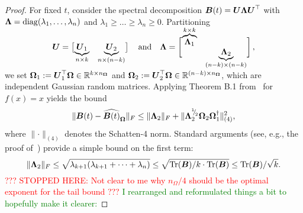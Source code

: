 \begin{proof}
For fixed $t$, consider the spectral decomposition $\boldsymbol{B}(t) = \boldsymbol{U} \boldsymbol{\Lambda} \boldsymbol{U}^{\top}$ with  
$\boldsymbol{\Lambda} = \operatorname{diag}(\lambda_1, \dots, \lambda_n)$ and $\lambda_1 \ge \dots \ge \lambda_n \ge 0$. Partitioning
    \begin{equation*}
        \rule[\dimexpr-2ex-\ht\strutbox]{0pt}{\dimexpr2ex+4ex+\baselineskip}
        \mtx{U} = \begin{bmatrix}
            \smash{\underbrace{\mtx{U}_1}_{n \times k}} & \smash{\underbrace{\mtx{U}_2}_{n \times (n-k)}}
        \end{bmatrix}
        \quad \text{and} \quad
        \mtx{\Lambda} =
        \begin{bmatrix}
            \smash{\overbrace{\mtx{\Lambda}_1}^{k \times k}} & \\ & \smash{\underbrace{\mtx{\Lambda}_2}_{(n-k) \times (n-k)}}
        \end{bmatrix},
    \end{equation*}
    we set
    $\boldsymbol{\Omega}_1 := \boldsymbol{U}_1^{\top} \boldsymbol{\Omega} \in \mathbb{R}^{k \times n_{\boldsymbol{\Omega}}}$ and $\boldsymbol{\Omega}_2 := \boldsymbol{U}_2^{\top} \boldsymbol{\Omega} \in \mathbb{R}^{(n - k) \times n_{\boldsymbol{\Omega}}}$, which are independent Gaussian random matrices.
Applying Theorem B.1 from~\cite{persson-2023-randomized-lowrank} for $f(x) = x$ yields the bound
    \begin{equation}
        \lVert \boldsymbol{B}(t) - \widehat{\boldsymbol{B}(t)}_{\boldsymbol{\Omega}} \rVert _F 
        \leq  \lVert \boldsymbol{\Lambda}_2 \rVert _F + \lVert \boldsymbol{\Lambda}_2^{{}^{1}{\mskip -5mu/\mskip -3mu}_{2}} \boldsymbol{\Omega}_2 \boldsymbol{\Omega}_1^{\dagger} \rVert _{(4)}^2,
        \label{equ:nystrom-proof-persson-bonud}
    \end{equation}
    where $\lVert \cdot \rVert _{(4)}$ denotes the Schatten-4 norm. Standard arguments (see, e.g., the proof of~\cite[Lemma 3]{meyer-2021-hutch-optimal}) provide a simple bound on the first term:
    \begin{equation}
        \lVert \boldsymbol{\Lambda}_2 \rVert _F
        \leq \sqrt{ \lambda_{k+1} (  \lambda_{k+1} + \cdots + \lambda_{n})}
        \leq \sqrt{ \operatorname{Tr}(\boldsymbol{B}) / k \cdot \operatorname{Tr}(\boldsymbol{B})}
        \leq \operatorname{Tr}(\boldsymbol{B}) / \sqrt{k}.
        \label{equ:nystrom-proof-frobenius-trace}
    \end{equation}
    \textcolor{red}{??? STOPPED HERE: Not clear to me why $n_\Omega/4$ should be the optimal exponent for the tail bound ???} \textcolor{green}{I rearranged and reformulated things a bit to hopefully make it clearer:}
    

\end{proof}
